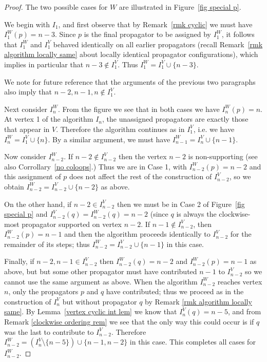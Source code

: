 \documentclass[11pt]{article}
\theoremstyle{remark}
\theoremstyle{definition}
\begin{document}
\begin{proof}
The two possible cases for $W$ are illustrated in Figure~\ref{fig special p}. 

We begin with $I_1$, and first observe that by Remark~\ref{rmk cyclic} we must have $I_1^W(p) = n-3$. Since $p$ is the final propagator to be assigned by $I_1^W$, it follows that $I_1^W$ and $I_1^V$ behaved identically on all earlier propagators (recall Remark~\ref{rmk algorithm locally same} about locally identical propagator configurations), which implies in particular that $n-3 \not\in I_1^V$. Thus $I_1^W = I_1^V\cup\{n-3\}$.

We note for future reference that the arguments of the previous two paragraphs also imply that $n-2,n-1,n \not\in I_1^V$.

Next consider $I_n^{W}$. From the figure we see that in both cases we have $I_n^{W}(p) = n$.  At vertex 1 of the algorithm $I_n$, the unassigned propagators are exactly those that appear in $V$. Therefore the algorithm continues as in $I_1^{V}$, i.e. we have $I_n^{W} = I_1^{V} \cup \{n\}$. By a similar argument, we must have $I_{n-1}^{W} = I_n^{V} \cup \{n-1\}$.

Now consider $I_{n-2}^{W}$. If $n-2\not\in I_{n-2}^{V}$ then the vertex $n-2$ is non-supporting (see also Corrollary~\ref{no coloops}.)  Thus we are in Case 1, with ${I_{n-2}^W(p) = n-2}$ and this assignment of $p$ does not affect the rest of the construction of $I_{n-2}^{V}$, so we obtain ${I_{n-2}^{W} = I_{n-2}^{V}\cup \{n-2\}}$ as above.

On the other hand, if $n-2\in I_{n-2}^{V}$ then we must be in Case 2 of Figure~\ref{fig special p} and $I_{n-2}^V(q) = I_{n-2}^W(q) = n-2$ (since $q$ is always the clockwise-most propagator supported on vertex $n-2$. If $n-1 \not\in I_{n-2}^{V}$, then $I_{n-2}^W(p) = n-1$ and then the algorithm proceeds identically to $I_{n-2}^{V}$ for the remainder of its steps; thus $I_{n-2}^{W} = I_{n-2}^{V}\cup \{n-1\}$ in this case.

Finally, if $n-2,n-1 \in I_{n-2}^{V}$ then $I_{n-2}^W(q) = n-2$ and $I_{n-2}^W(p) = n-1$ as above, but but some other propagator must have contributed $n-1$ to $I_{n-2}^{V}$ so we cannot use the same argument as above. When the algorithm $I_{n-2}^W$ reaches vertex $n$, only the propagators $p$ and $q$ have contributed; thus we proceed as in the construction of $I_n^{V}$ but without propagator $q$ by Remark \ref{rmk algorithm locally same}. By Lemma~\ref{vertex cyclic int lem} we know that $I_n^V(q) = n-5$, and from Remark \ref{clockwise ordering rem} we see that the only way this could occur is if $q$ was the last to contribute to $I_{n-2}^V$. %
Therefore $I_{n-2}^{W} = (I_{n}^{V} \setminus \{n-5\}) \cup \{n-1, n-2\}$ in this case. This completes all cases for $I_{n-2}^{W}$.


\end{proof}
\end{document}
